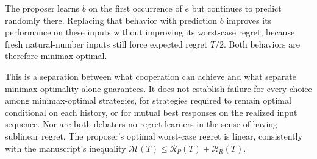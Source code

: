 \documentclass[11pt]{article}
\newcommand{\Reg}{\mathcal R}
\newcommand{\Mi}{\mathcal M}
\begin{document}
The proposer learns $b$ on the first occurrence of $e$ but continues to
predict randomly there. Replacing that behavior with prediction $b$
improves its performance on these inputs without improving its worst-case
regret, because fresh natural-number inputs still force expected regret
$T/2$. Both behaviors are therefore minimax-optimal.

This is a separation between what cooperation can achieve and what
separate minimax optimality alone guarantees. It does not establish
failure for every choice among minimax-optimal strategies, for strategies
required to remain optimal conditional on each history, or for mutual
best responses on the realized input sequence. Nor are both debaters
no-regret learners in the sense of having sublinear regret. The
proposer's optimal worst-case regret is linear, consistently with the
manuscript's inequality $\Mi(T)\le\Reg_P(T)+\Reg_R(T)$.
\end{document}

